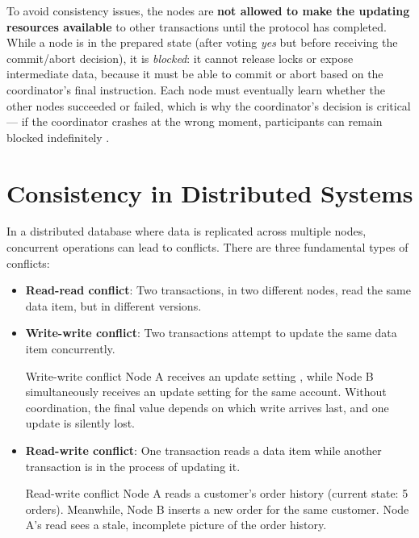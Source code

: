 To avoid consistency issues, the nodes are \textbf{not allowed to make the updating resources available} to other transactions until the protocol has completed. While a node is in the prepared state (after voting \emph{yes} but before receiving the commit/abort decision), it is \emph{blocked}: it cannot release locks or expose intermediate data, because it must be able to commit or abort based on the coordinator's final instruction. Each node must eventually learn whether the other nodes succeeded or failed, which is why the coordinator's decision is critical --- if the coordinator crashes at the wrong moment, participants can remain blocked indefinitely \cite{kleppmann2017ddia}.

\section{Consistency in Distributed Systems}
In a distributed database where data is replicated across multiple nodes, concurrent operations can lead to conflicts. There are three fundamental types of conflicts:

\begin{itemize}
    \item \textbf{Read-read conflict}: Two transactions, in two different nodes, read the same data item, but in different versions. 
    \item \textbf{Write-write conflict}: Two transactions attempt to update the same data item concurrently. 
    \begin{example}{Write-write conflict}
        Node A receives an update setting , while Node B simultaneously receives an update setting  for the same account. Without coordination, the final value depends on which write arrives last, and one update is silently lost.
    \end{example}
    \item \textbf{Read-write conflict}: One transaction reads a data item while another transaction is in the process of updating it.
    \begin{example}{Read-write conflict}
        Node A reads a customer's order history (current state: 5 orders). Meanwhile, Node B inserts a new order for the same customer. Node A's read sees a stale, incomplete picture of the order history.
    \end{example}
\end{itemize}

